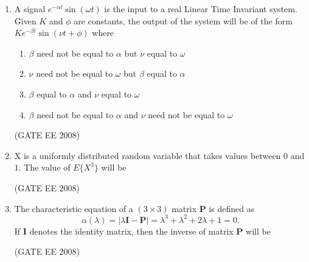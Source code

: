 \documentclass[journal,12pt,onecolumn]{IEEEtran}
\theoremstyle{remark}
\begin{document}
\begin{enumerate}[start=1, label=Q.\arabic*]
\item A signal $e^{-\alpha t} \sin(\omega t)$ is the input to a real Linear Time Invariant system. 
Given $K$ and $\phi$ are constants, the output of the system will be of the form 
$K e^{-\beta t} \sin(\nu t + \phi)$ where
\begin{enumerate}
\item $\beta$ need not be equal to $\alpha$ but $\nu$ equal to $\omega$
    \item $\nu$ need not be equal to $\omega$ but $\beta$ equal to $\alpha$
    \item $\beta$ equal to $\alpha$ and $\nu$ equal to $\omega$
    \item $\beta$ need not be equal to $\alpha$ and $\nu$ need not be equal to $\omega$
\end{enumerate}
\hfill (GATE EE 2008)




\item X is a uniformly distributed random variable that takes values between $0$ and $1$. 
The value of $E\{X^3\}$ will be %
\begin{enumerate}
\end{enumerate}
\hfill (GATE EE 2008)




\item The characteristic equation of a $(3 \times 3)$ matrix $\mathbf{P}$ is defined as
\[
\alpha(\lambda) = \lvert \lambda \mathbf{I} - \mathbf{P} \rvert 
= \lambda^3 + \lambda^2 + 2\lambda + 1 = 0.
\] %
If $\mathbf{I}$ denotes the identity matrix, then the inverse of matrix $\mathbf{P}$ will be

\begin{enumerate}
\end{enumerate}
\hfill (GATE EE 2008)





\end{enumerate}
\end{document}
